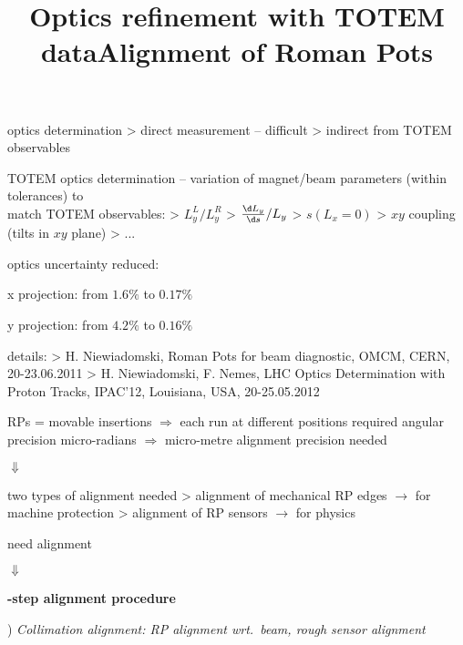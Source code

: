 \vfil
\> optics determination
\>> direct measurement -- difficult
\>> indirect from TOTEM observables

\vfil
\> TOTEM optics determination -- variation of magnet/beam parameters (within tolerances) to\\ match TOTEM observables:
\>> $L_y^L / L_y^R$
\>> ${\d L_y\over \d s} / L_y$
\>> $s(L_x = 0)$
\>> $xy$ coupling (tilts in $xy$ plane)
\>> ...

\vfil


\newpage %
\title{Optics refinement with TOTEM data}

\centerline{}

\vfil
{}

\vfil

\> optics uncertainty reduced:

\centerline{x projection: from $1.6\%$ to $0.17\%$}
\centerline{y projection: from $4.2\%$ to $0.16\%$}

\vfil

{\SmallerFonts
\> details:
\>> H. Niewiadomski, Roman Pots for beam diagnostic, OMCM, CERN, 20-23.06.2011
\>> H. Niewiadomski, F. Nemes, LHC Optics Determination with Proton Tracks, IPAC'12, Louisiana, USA, 20-25.05.2012
}

\vfil

\newpage %
\title{Alignment of Roman Pots}

\> RPs = movable insertions $\Rightarrow$ each run at different positions
\> required angular precision micro-radians $\Rightarrow$ micro-metre alignment precision needed

\vfil
\centerline{$\Downarrow$}
\vfil

\> two types of alignment needed
\>> alignment of mechanical RP edges $\rightarrow$ for machine protection
\>> alignment of RP sensors $\rightarrow$ for physics

\> need alignment 

\vfil
\centerline{$\Downarrow$}
\vfil

\centerline{\bf{}-step alignment procedure\cFg}

\vfil

) \em{\cYe Collimation alignment}\cFg: RP alignment wrt.~beam, rough sensor alignment

